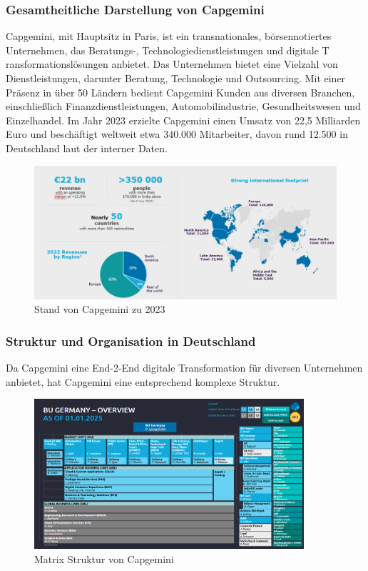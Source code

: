 \documentclass[a4paper, 12pt]{scrartcl}
\begin{document}
	\subsubsection{Gesamtheitliche Darstellung von Capgemini} %
Capgemini, mit Hauptsitz in Paris, ist ein transnationales, börsennotiertes Unternehmen, das Beratungs-, Technologiedienstleistungen und digitale T ransformationslösungen anbietet. Das Unternehmen bietet eine Vielzahl von Dienstleistungen, darunter Beratung, Technologie und Outsourcing. Mit einer Präsenz in über 50 Ländern bedient Capgemini Kunden aus diversen Branchen, einschließlich Finanzdienstleistungen, Automobilindustrie, Gesundheitswesen und Einzelhandel. Im Jahr 2023 erzielte Capgemini einen Umsatz von 22,5 Milliarden Euro und beschäftigt weltweit etwa 340.000 Mitarbeiter, davon rund 12.500 in Deutschland laut der interner Daten.
	\begin{figure}[h]
		\begin{center}
			\includegraphics[width=12cm]{CApgemini.png}
			\caption{Stand von Capgemini zu 2023}
			\label{Stand von Capgemini}
		\end{center}
	\end{figure}
	\subsubsection{Struktur und Organisation in Deutschland}
Da Capgemini eine End-2-End digitale Transformation für diversen Unternehmen anbietet, hat Capgemini eine entsprechend komplexe Struktur. 
	\begin{figure}[h]
	\begin{center}
		\includegraphics[width=10cm]{BU Germany CAP.png}
		\caption{Matrix Struktur von Capgemini}
		\label{Matrix Struktur}
	\end{center}
\end{figure}
	\newpage
\end{document}
